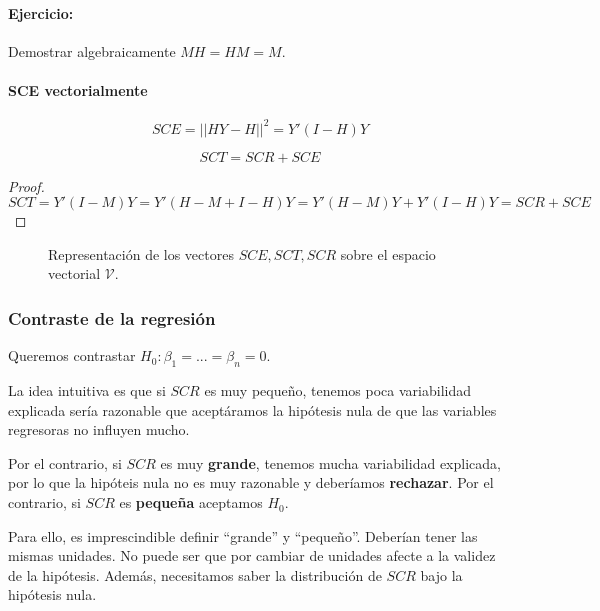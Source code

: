 \paragraph{Ejercicio: } Demostrar algebraicamente $MH=HM=M$.

\paragraph{SCE vectorialmente}
\[SCE = ||HY-H||^2 = Y'(I-H)Y\]

\begin{prop}
\[SCT = SCR + SCE\]
\end{prop}

\begin{proof}
\[SCT = Y'(I-M)Y = Y'(H-M+I-H)Y = Y'(H-M)Y + Y'(I-H)Y = SCR + SCE\]
\end{proof}

\begin{figure}[hbtp]
	\centering
	\caption{Representación de los vectores $SCE,SCT,SCR$ sobre el espacio vectorial $\mathcal{V}$.}
\end{figure}

\subsubsection{Contraste de la regresión}
Queremos contrastar $H_0 : β_1 = ... = β_n = 0$.

La idea intuitiva es que si $SCR$ es muy pequeño, tenemos poca variabilidad explicada sería razonable que aceptáramos la hipótesis nula de que las variables regresoras no influyen mucho.

Por el contrario, si $SCR$ es muy \textbf{grande}, tenemos mucha variabilidad explicada, por lo que la hipóteis nula no es muy razonable y deberíamos \textbf{rechazar}. Por el contrario, si $SCR$ es \textbf{pequeña} aceptamos $H_0$.


Para ello, es imprescindible definir ``grande'' y ``pequeño''. Deberían tener las mismas unidades. No puede ser que por cambiar de unidades afecte a la validez de la hipótesis. Además, necesitamos saber la distribución de $SCR$ bajo la hipótesis nula.

